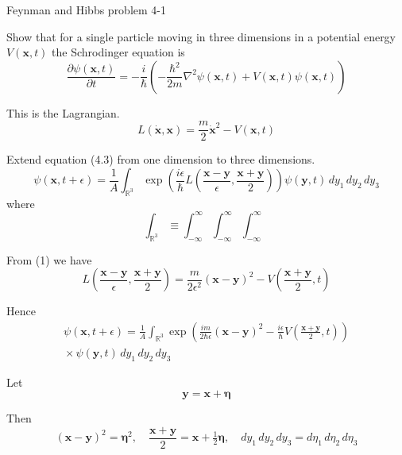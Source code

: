 \documentclass[12pt]{article}
\begin{document}
\begin{center}
Feynman and Hibbs problem 4-1
\end{center}

Show that for a single particle moving in three dimensions
in a potential energy $V(\mathbf x,t)$ the Schrodinger equation is
\begin{equation*}
\frac{\partial\psi(\mathbf x,t)}{\partial t}
=-\frac{i}{\hbar}\left(
-\frac{\hbar^2}{2m}\nabla^2\psi(\mathbf x,t)+V(\mathbf x,t)\psi(\mathbf x,t)\right)
\end{equation*}

This is the Lagrangian.
\begin{equation*}
L(\dot{\mathbf x},\mathbf x)=\frac{m}{2}\dot{\mathbf x}^2-V(\mathbf{x},t)\tag{1}
\end{equation*}

Extend equation (4.3) from one dimension to three dimensions.
\begin{equation*}
\psi(\mathbf{x},t+\epsilon)
=\frac{1}{A}\int_{\mathbb R^3}
\exp\left(
\frac{i\epsilon}{\hbar}L
\left(\frac{\mathbf{x}-\mathbf{y}}{\epsilon},\frac{\mathbf{x}+\mathbf{y}}{2}\right)
\right)\psi(\mathbf{y},t)\,dy_1\,dy_2\,dy_3
\end{equation*}
where
\begin{equation*}
\int_{\mathbb R^3}
\equiv\int_{-\infty}^\infty\int_{-\infty}^\infty\int_{-\infty}^\infty
\end{equation*}

From (1) we have
\begin{equation*}
L\left(\frac{\mathbf{x}-\mathbf{y}}{\epsilon},\frac{\mathbf{x}+\mathbf{y}}{2}\right)
=\frac{m}{2\epsilon^2}(\mathbf{x}-\mathbf{y})^2
-V\left(\frac{\mathbf{x}+\mathbf{y}}{2},t\right)
\end{equation*}

Hence
\begin{multline*}
\psi(\mathbf{x},t+\epsilon)=
\frac{1}{A}\int_{\mathbb R^3}
\exp\left(
\frac{im}{2\hbar\epsilon}(\mathbf{x}-\mathbf{y})^2
-\frac{i\epsilon}{\hbar}V\left(\frac{\mathbf{x}+\mathbf{y}}{2},t\right)
\right)
\\
{}\times\psi(\mathbf{y},t)
\,dy_1\,dy_2\,dy_3
\end{multline*}

Let
\begin{equation*}
\mathbf y=\mathbf x+\boldsymbol\eta
\end{equation*}

Then
\begin{equation*}
(\mathbf x-\mathbf y)^2=\boldsymbol\eta^2,\quad
\frac{\mathbf x+\mathbf y}{2}=\mathbf{x}+\tfrac{1}{2}\boldsymbol\eta,\quad
dy_1\,dy_2\,dy_3=d\eta_1\,d\eta_2\,d\eta_3
\end{equation*}
\end{document}
